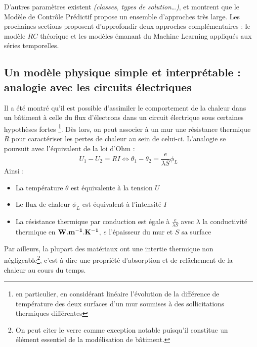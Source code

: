         D'autres paramètres existent \textit{(classes, types de solution…)}, et montrent que le Modèle de Contrôle Prédictif propose un ensemble d'approches très large.
        Les prochaines sections proposent d'approfondir deux approches complémentaires : le modèle $RC$ théorique et les modèles émanant du Machine Learning appliqués aux séries temporelles.

    \subsection{Un modèle physique simple et interprétable : analogie avec les circuits électriques}\label{subsec:AE_rc}

        Il a été montré\cite{elec_analog, fraisse_elec_analog} qu'il est possible
        d'assimiler le comportement de la chaleur dans un bâtiment à
        celle du flux d'électrons dans un circuit électrique sous certaines hypothèses
        fortes
        \footnote{en particulier, en considérant linéaire l'évolution de la différence de température des deux surfaces d'un mur soumises à des sollicitations thermiques différentes}.
        Dès lors, on peut associer à un mur une résistance thermique $R$ pour caractériser
        les pertes de chaleur au sein de celui-ci.
        L'analogie se poursuit avec l'équivalent de la loi d'Ohm :
        \begin{equation}
            U_1-U_2=RI\Longleftrightarrow \theta_1 - \theta_2 = \frac e{\lambda S}\phi_L\label{eq:equation2}
        \end{equation}
        Ainsi :
        \begin{itemize}
            \item La température $\theta$ est équivalente à la tension $U$
            \item Le flux de chaleur $\phi_L$ est équivalent à l'intensité $I$
            \item La résistance thermique par conduction est égale à $\frac e{\lambda S}$ avec
            $\lambda$ la
            conductivité thermique en $\bf W.m^{-1}.K^{-1}$, $e$
            l'épaisseur du mur et $S$ sa surface
        \end{itemize}
        Par ailleurs, la plupart des matériaux ont une intertie thermique non négligeable\footnote{On peut citer le verre comme exception notable puisqu'il constitue un élément essentiel de la modélisation de bâtiment.}, c'est-à-dire une propriété d'absorption et de relâchement de la chaleur au cours du temps.

